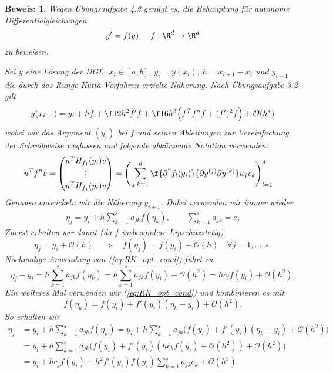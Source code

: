 \documentclass[
]{mycourse}
\theoremstyle{mythm}
\theoremstyle{break}
\newtheorem*{beweis}{Beweis:}
\newcommand{\labeq}[1]{\label{eq:#1}}			%
\newcommand{\req}[1]{(\ref{eq:#1})}
\begin{document}
\begin{beweis}
Wegen Übungsaufgabe 4.2 genügt es, die Behauptung für \emph{autonome} Differentialgleichungen
\[
y'=f(y), \quad f:\R^d \to \R^d
\]
zu beweisen.

Sei $y$ eine Lösung der DGL, $x_i\in [a,b]$, $y_i=y(x_i)$, $h=x_{i+1}-x_i$ und $y_{i+1}$ die durch das Runge-Kutta Verfahren 
erzielte Näherung. Nach Übungsaufgabe 3.2 gilt
\begin{align*}
y(x_{i+1})=y_i+h f+\f 12 h^2 f' f + \f 16 h^3 \Big( f^T f'' f + (f')^2 f \Big) + \mathcal{O}(h^4)
\end{align*}
wobei wir das Argument $(y_i)$ bei $f$ und seinen Ableitungen zur Vereinfachung der Schreibweise weglassen und folgende abkürzende Notation verwenden:
\begin{align*}
	u^T f'' v &= \begin{pmatrix}
		u^T H_{f_1}(y_i) v \\
		\vdots \\
		u^T H_{f_1}(y_i) v
	\end{pmatrix}
	= \Bigg( \sum_{j,k=1}^d \f{\partial^2 f_l(y_i)}{\partial y^{(j)}\partial y^{(k)}} u_jv_k \Bigg)_{l=1}^d
\end{align*}
Genauso entwickeln wir die Näherung $y_{i+1}$. Dabei verwenden wir immer wieder
\begin{align}\labeq{RK_opt_cond}
\eta_j = y_i + h \sum_{k=1}^s a_{jk} f(\eta_k), \qquad  \sum_{k=1}^s a_{jk}=c_j 
\end{align}
Zuerst erhalten wir damit (da $f$ insbesondere Lipschitzstetig)
\[
\eta_j=y_i + \mathcal{O}(h) \quad \Longrightarrow \quad f(\eta_j)=f(y_i) + \mathcal{O}(h) \quad \forall j=1,\ldots,s.
\]
Nochmalige Anwendung von \req{RK_opt_cond} führt zu
\[
\eta_j - y_i = h \sum_{k=1}^s a_{jk} f(\eta_k) = h \sum_{k=1}^s a_{jk} f(y_i) + \mathcal{O}(h^2)= h c_j f(y_i) + \mathcal{O}(h^2).
\]
Ein weiteres Mal verwenden wir \req{RK_opt_cond} und kombinieren es mit
\[
f(\eta_k)=f(y_i)+f'(y_i)(\eta_k-y_i) + \mathcal{O}(h^2).
\]
So erhalten wir
\begin{align*}
\eta_j &=  y_i + h \sum_{k=1}^s a_{jk} f(\eta_k) 
= y_i + h \sum_{k=1}^s a_{jk} \Big(f(y_i) + f'(y_i) (\eta_k-y_i) + \mathcal{O}(h^2)\Big)\\
&= y_i + h \sum_{k=1}^s a_{jk} \bigg(f(y_i) + f'(y_i) \left(h c_k f(y_i) + \mathcal{O}(h^2) \right) + \mathcal{O}(h^2)\bigg)\\
&= y_i + h c_j f(y_i)
+ h^2 f'(y_i) f(y_i) \sum_{k=1}^s a_{jk} c_k  
+ \mathcal{O}(h^3)
\end{align*}


\end{beweis}
\end{document}
